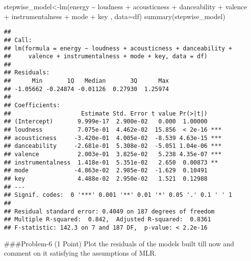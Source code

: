 \documentclass[
]{article}
\newenvironment{Shaded}{\begin{snugshade}}{\end{snugshade}}
\newcommand{\AttributeTok}[1]{\textcolor[rgb]{0.77,0.63,0.00}{#1}}
\newcommand{\DecValTok}[1]{\textcolor[rgb]{0.00,0.00,0.81}{#1}}
\newcommand{\FunctionTok}[1]{\textcolor[rgb]{0.00,0.00,0.00}{#1}}
\newcommand{\NormalTok}[1]{#1}
\newcommand{\OtherTok}[1]{\textcolor[rgb]{0.56,0.35,0.01}{#1}}
\newcommand{\SpecialCharTok}[1]{\textcolor[rgb]{0.00,0.00,0.00}{#1}}
\newcommand{\StringTok}[1]{\textcolor[rgb]{0.31,0.60,0.02}{#1}}
\begin{document}
\begin{Shaded}
\begin{Highlighting}[]
\NormalTok{stepwise\_model}\OtherTok{\textless{}{-}}\FunctionTok{lm}\NormalTok{(energy }\SpecialCharTok{\textasciitilde{}}\NormalTok{ loudness }\SpecialCharTok{+}\NormalTok{ acousticness }\SpecialCharTok{+}\NormalTok{ danceability }\SpecialCharTok{+}\NormalTok{ valence }\SpecialCharTok{+}\NormalTok{ instrumentalness }\SpecialCharTok{+}\NormalTok{ mode }\SpecialCharTok{+}\NormalTok{ key , }\AttributeTok{data=}\NormalTok{df)}
\FunctionTok{summary}\NormalTok{(stepwise\_model)}
\end{Highlighting}
\end{Shaded}

\begin{verbatim}
## 
## Call:
## lm(formula = energy ~ loudness + acousticness + danceability + 
##     valence + instrumentalness + mode + key, data = df)
## 
## Residuals:
##      Min       1Q   Median       3Q      Max 
## -1.05662 -0.24874 -0.01126  0.27930  1.25974 
## 
## Coefficients:
##                    Estimate Std. Error t value Pr(>|t|)    
## (Intercept)       9.999e-17  2.900e-02   0.000  1.00000    
## loudness          7.075e-01  4.462e-02  15.856  < 2e-16 ***
## acousticness     -3.420e-01  4.005e-02  -8.539 4.63e-15 ***
## danceability     -2.681e-01  5.308e-02  -5.051 1.04e-06 ***
## valence           2.003e-01  3.825e-02   5.238 4.35e-07 ***
## instrumentalness  1.418e-01  5.351e-02   2.650  0.00873 ** 
## mode             -4.863e-02  2.985e-02  -1.629  0.10491    
## key               4.488e-02  2.950e-02   1.521  0.12988    
## ---
## Signif. codes:  0 '***' 0.001 '**' 0.01 '*' 0.05 '.' 0.1 ' ' 1
## 
## Residual standard error: 0.4049 on 187 degrees of freedom
## Multiple R-squared:  0.842,  Adjusted R-squared:  0.8361 
## F-statistic: 142.3 on 7 and 187 DF,  p-value: < 2.2e-16
\end{verbatim}

\#\#\#Problem-6 (1 Point) Plot the residuals of the models built till
now and comment on it satisfying the assumptions of MLR.

\begin{Shaded}
\end{Shaded}
\end{document}
